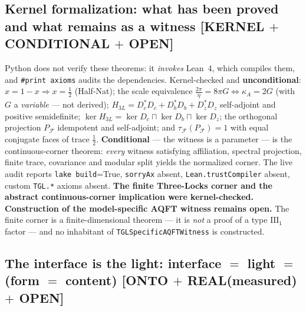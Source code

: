 \documentclass[11pt]{article}
\theoremstyle{definition}\newtheorem{deriv}{Derivation}
\begin{document}
\subsection*{Kernel formalization: what has been proved and what remains as a witness \textsf{[KERNEL $+$ CONDITIONAL $+$ OPEN]}}

Python does not verify these theorems: it \emph{invokes} Lean~4, which compiles them, and \texttt{\#print axioms} audits the dependencies. Kernel-checked and \textbf{unconditional}: $x=1-x\Rightarrow x=\tfrac12$ (Half-Nat); the scale equivalence $\tfrac{2\pi}{\eta}=8\pi G\iff\kappa_A=2G$ (with $G$ a \emph{variable} --- not derived); $H_{3L}=D_c^{*}D_c+D_b^{*}D_b+D_z^{*}D_z$ self-adjoint and positive semidefinite; $\ker H_{3L}=\ker D_c\sqcap\ker D_b\sqcap\ker D_z$; the orthogonal projection $P_{\mathcal F}$ idempotent and self-adjoint; and $\tau_{\mathcal F}(P_{\mathcal F})=1$ with equal conjugate faces of trace $\tfrac12$. \textbf{Conditional} --- the witness is a parameter --- is the continuous-corner theorem: \emph{every} witness satisfying affiliation, spectral projection, finite trace, covariance and modular split yields the normalized corner. The live audit reports \texttt{lake build}=True, \texttt{sorryAx} absent, \texttt{Lean.trustCompiler} absent, custom \texttt{TGL.*} axioms absent. \textbf{The finite Three-Locks corner and the abstract continuous-corner implication were kernel-checked. Construction of the model-specific AQFT witness remains open.} The finite corner is a finite-dimensional theorem --- it is \emph{not} a proof of a type $\mathrm{III}_1$ factor --- and no inhabitant of \texttt{TGLSpecificAQFTWitness} is constructed.

\subsection*{The interface is the light: interface $=$ light $=$ (form $=$ content) \textsf{[ONTO $+$ REAL(measured) $+$ OPEN]}}
\end{document}

